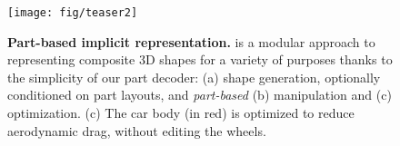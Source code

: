 

\begin{figure}[t]
	\centering
	\vspace{-2mm}
	\texttt{[image: fig/teaser2]}
	\vspace{-6mm}
	\caption{\textbf{Part-based implicit representation.} \PSDF{} is a modular approach to representing composite 3D shapes for a variety of purposes thanks to the simplicity of our part decoder: (a) shape generation, optionally conditioned on part layouts, and \textit{part-based} (b) manipulation and (c) optimization. (c) The car body (in red) is optimized to reduce aerodynamic drag, without editing the wheels.}
	\label{fig:teaser}
	\vspace{-3mm}
\end{figure}